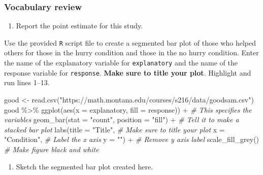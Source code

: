 \documentclass[
]{report}
\newenvironment{Shaded}{\begin{snugshade}}{\end{snugshade}}
\newcommand{\AttributeTok}[1]{\textcolor[rgb]{0.77,0.63,0.00}{#1}}
\newcommand{\CommentTok}[1]{\textcolor[rgb]{0.56,0.35,0.01}{\textit{#1}}}
\newcommand{\FunctionTok}[1]{\textcolor[rgb]{0.00,0.00,0.00}{#1}}
\newcommand{\NormalTok}[1]{#1}
\newcommand{\OtherTok}[1]{\textcolor[rgb]{0.56,0.35,0.01}{#1}}
\newcommand{\SpecialCharTok}[1]{\textcolor[rgb]{0.00,0.00,0.00}{#1}}
\newcommand{\StringTok}[1]{\textcolor[rgb]{0.31,0.60,0.02}{#1}}
\providecommand{\tightlist}{%
  \setlength{\itemsep}{0pt}\setlength{\parskip}{0pt}}
\begin{document}
\hypertarget{vocabulary-review-2}{%
\subsubsection*{Vocabulary review}\label{vocabulary-review-2}}

\begin{enumerate}
\def\labelenumi{\arabic{enumi}.}
\tightlist
\item
  Report the point estimate for this study.
\end{enumerate}

\vspace{0.4in}

Use the provided \texttt{R} script file to create a segmented bar plot of those who helped others for those in the hurry condition and those in the no hurry condition. Enter the name of the explanatory variable for \texttt{explanatory} and the name of the response variable for \texttt{response}. \textbf{Make sure to title your plot}. Highlight and run lines 1--13.

\begin{Shaded}
\begin{Highlighting}[]
\NormalTok{good }\OtherTok{\textless{}{-}} \FunctionTok{read.csv}\NormalTok{(}\StringTok{"https://math.montana.edu/courses/s216/data/goodsam.csv"}\NormalTok{)}
\NormalTok{good }\SpecialCharTok{\%\textgreater{}\%}
        \FunctionTok{ggplot}\NormalTok{(}\FunctionTok{aes}\NormalTok{(}\AttributeTok{x =}\NormalTok{ explanatory, }\AttributeTok{fill =}\NormalTok{ response)) }\SpecialCharTok{+}   \CommentTok{\# This specifies the variables}
  \FunctionTok{geom\_bar}\NormalTok{(}\AttributeTok{stat =} \StringTok{"count"}\NormalTok{, }\AttributeTok{position =} \StringTok{"fill"}\NormalTok{) }\SpecialCharTok{+}  \CommentTok{\# Tell it to make a stacked bar plot}
  \FunctionTok{labs}\NormalTok{(}\AttributeTok{title =} \StringTok{"Title"}\NormalTok{,  }\CommentTok{\# Make sure to title your plot }
       \AttributeTok{x =} \StringTok{"Condition"}\NormalTok{,   }\CommentTok{\# Label the x axis}
       \AttributeTok{y =} \StringTok{""}\NormalTok{) }\SpecialCharTok{+}  \CommentTok{\# Remove y axis label}
    \FunctionTok{scale\_fill\_grey}\NormalTok{()  }\CommentTok{\# Make figure black and white}
\end{Highlighting}
\end{Shaded}

\begin{enumerate}
\def\labelenumi{\arabic{enumi}.}
\setcounter{enumi}{1}
\tightlist
\item
  Sketch the segmented bar plot created here.
\end{enumerate}
\end{document}
